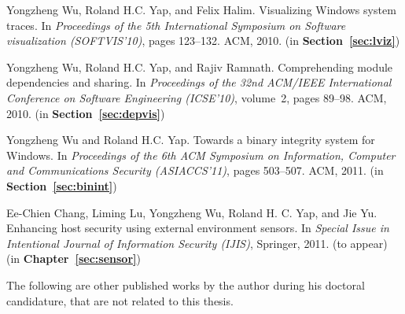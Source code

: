 \begin{tightenumerate}
\item
Yongzheng Wu, Roland H.C. Yap, and Felix Halim.
\newblock Visualizing Windows system traces.
\newblock In {\em Proceedings of the 5th International Symposium on Software
  visualization (SOFTVIS'10)}, pages 123--132. ACM, 2010.
\newblock (in {\bf Section~\ref{sec:lviz}})

\item
Yongzheng Wu, Roland H.C. Yap, and Rajiv Ramnath.
\newblock Comprehending module dependencies and sharing.
\newblock In {\em Proceedings of the 32nd ACM/IEEE International Conference on
  Software Engineering (ICSE'10)}, volume~2, pages 89--98. ACM, 2010.
\newblock (in {\bf Section~\ref{sec:depvis}})

\item
Yongzheng Wu and Roland H.C. Yap.
\newblock Towards a binary integrity system for Windows.
\newblock In {\em Proceedings of the 6th ACM Symposium on Information, Computer
  and Communications Security (ASIACCS'11)},
  pages 503--507. ACM, 2011.
\newblock (in {\bf Section~\ref{sec:binint}})

\item
Ee-Chien Chang, Liming Lu, Yongzheng Wu, Roland H. C. Yap, and Jie Yu.
\newblock Enhancing host security using external environment sensors.
\newblock In {\em Special Issue in Intentional Journal of Information Security (IJIS)},
  Springer, 2011. (to appear)
\newblock (in {\bf Chapter~\ref{sec:sensor}})
\end{tightenumerate}

The following are other published works by the author during
his doctoral candidature, that are not related to this thesis.

